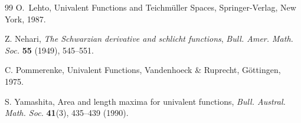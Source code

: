 \documentclass[a4paper,12pt]{amsart}
\theoremstyle{plain}
\theoremstyle{definition}
\begin{document}
\begin{thebibliography}{99}
{\sc O.~Lehto},
{Univalent Functions and Teichmüller Spaces},
\newblock Springer-Verlag, New York, 1987.

{\sc Z. Nehari}, {\em The Schwarzian derivative and schlicht functions}, \textit{Bull. Amer. Math. Soc.} {\bf 55} (1949), 545--551.

{\sc C. Pommerenke}, {Univalent Functions}, 
Vandenhoeck \& Ruprecht, Göttingen, 1975.

{\sc S. Yamashita}, {Area and length maxima for univalent functions}, \textit{Bull. Austral. Math. Soc.}  \textbf{41}(3), 435--439 (1990).






\end{thebibliography}
\end{document}

